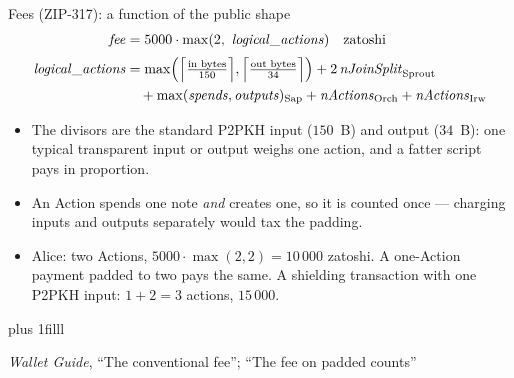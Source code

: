 \documentclass[aspectratio=169,11pt]{beamer}
\newcommand{\src}[1]{\par\vskip0pt plus 1filll
  {\fontsize{6}{7.2}\selectfont\color{arbdim}\raggedright #1\par}}
\begin{document}
\begin{frame}{Fees (ZIP-317): a function of the public shape}
\begin{align*}
  \mathit{fee} &= 5000 \cdot \max(2,\ \mathit{logical\_actions})
  \quad\text{zatoshi} \\[2pt]
  \mathit{logical\_actions} &=
  \max\Bigl(\Bigl\lceil \tfrac{\text{in bytes}}{150} \Bigr\rceil,
            \Bigl\lceil \tfrac{\text{out bytes}}{34} \Bigr\rceil\Bigr)
  + 2\,\mathit{nJoinSplit}_{\mathrm{Sprout}} \\
  &\quad + \max(\mathit{spends}, \mathit{outputs})_{\mathrm{Sap}}
  + \mathit{nActions}_{\mathrm{Orch}}
  + \mathit{nActions}_{\mathrm{Irw}}
\end{align*}
\small
\begin{itemize}
  \item The divisors are the standard P2PKH input ($150$~B) and output
    ($34$~B): one typical transparent input or output weighs one action,
    and a fatter script pays in proportion.
  \item An Action spends one note \emph{and} creates one, so it is
    counted once --- charging inputs and outputs separately would tax
    the padding.
  \item Alice: two Actions, $5000 \cdot \max(2, 2) = 10\,000$ zatoshi.
    A one-Action payment padded to two pays the same. A shielding
    transaction with one P2PKH input: $1 + 2 = 3$ actions, $15\,000$.
\end{itemize}
\src{\emph{Wallet Guide}, ``The conventional fee''; ``The fee on padded
  counts''}
\end{frame}
\end{document}
